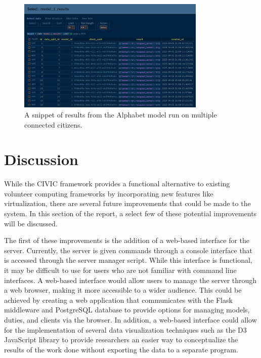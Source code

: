 \documentclass[11pt]{article}
\begin{document}
\begin{figure}[h]
    \centering
    \includegraphics[width=0.8\textwidth]{./figures/alphabet.png}
    \caption{\small A snippet of results from the Alphabet model run on multiple connected citizens.}\label{fig:alphabet_1}
\end{figure}

\newpage

\section{Discussion}

While the CIVIC framework provides a functional alternative to existing volunteer computing frameworks by incorporating new features like virtualization, there are several future improvements that could be made to the system. In this section of the report, a select few of these potential improvements will be discussed. 

The first of these improvements is the addition of a web-based interface for the server. Currently, the server is given commands through a console interface that is accessed through the server manager script. While this interface is functional, it may be difficult to use for users who are not familiar with command line interfaces. A web-based interface would allow users to manage the server through a web browser, making it more accessible to a wider audience. This could be achieved by creating a web application that communicates with the Flask middleware and PostgreSQL database to provide options for managing models, duties, and clients via the browser. In addition, a web-based interface could allow for the implementation of several data visualization techniques such as the D3 JavaScript library to provide researchers an easier way to conceptualize the results of the work done without exporting the data to a separate program.
\end{document}

